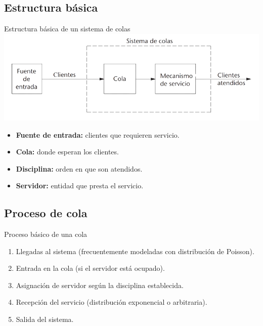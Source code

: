 \documentclass{beamer}
\begin{document}
\subsection{Estructura básica}
\begin{frame}{Estructura básica de un sistema de colas}
\includegraphics[width=0.9\linewidth]{images/cola_basica.png} %
\vspace{0.3cm}
\begin{itemize}
    \item \textbf{Fuente de entrada:} clientes que requieren servicio.
    \item \textbf{Cola:} donde esperan los clientes.
    \item \textbf{Disciplina:} orden en que son atendidos.
    \item \textbf{Servidor:} entidad que presta el servicio.
\end{itemize}
\end{frame}

\subsection{Proceso de cola}
\begin{frame}{Proceso básico de una cola}
    \begin{enumerate}
        \item Llegadas al sistema (frecuentemente modeladas con distribución de Poisson).
        \item Entrada en la cola (si el servidor está ocupado).
        \item Asignación de servidor según la disciplina establecida.
        \item Recepción del servicio (distribución exponencial o arbitraria).
        \item Salida del sistema.
    \end{enumerate}
\end{frame}
\end{document}
